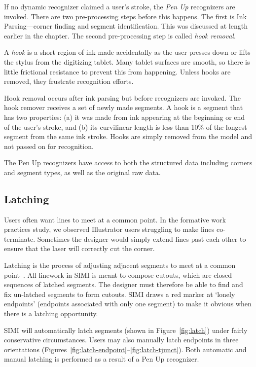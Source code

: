 If no dynamic recognizer claimed a user's stroke, the \textit{Pen Up}
recognizers are invoked. There are two pre-processing steps before
this happens. The first is Ink Parsing---corner finding and segment
identification. This was discussed at length earlier in the
chapter. The second pre-processing step is called \textit{hook
  removal}.

A \textit{hook} is a short region of ink made accidentally as the user
presses down or lifts the stylus from the digitizing tablet. Many
tablet surfaces are smooth, so there is little frictional resistance
to prevent this from happening. Unless hooks are removed, they
frustrate recognition efforts.

Hook removal occurs after ink parsing but before recognizers are
invoked. The hook remover receives a set of newly made segments. A
hook is a segment that has two properties: (a) it was made from ink
appearing at the beginning or end of the user's stroke, and (b) its
curvilinear length is less than 10\% of the longest segment from the
same ink stroke. Hooks are simply removed from the model and not
passed on for recognition.

The Pen Up recognizers have access to both the structured data
including corners and segment types, as well as the original raw data.

\subsection{Latching}



Users often want lines to meet at a common point. In the formative
work practices study, we observed Illustrator users struggling to make
lines co-terminate. Sometimes the designer would simply extend lines
past each other to ensure that the laser will correctly cut the
corner.

Latching is the process of adjusting adjacent segments to meet at a
common point~\cite{herot-latch-corners}. All linework in SIMI is meant
to compose cutouts, which are closed sequences of latched
segments. The designer must therefore be able to find and fix
un-latched segments to form cutouts. SIMI draws a red marker at
`lonely endpoints' (endpoints associated with only one segment) to
make it obvious when there is a latching opportunity.

SIMI will automatically latch segments (shown in
Figure~\ref{fig:latch}) under fairly conservative circumstances. Users
may also manually latch endpoints in three orientations
(Figures~\ref{fig:latch-endpoint}--\ref{fig:latch-tjunct}). Both
automatic and manual latching is performed as a result of a Pen Up
recognizer.

